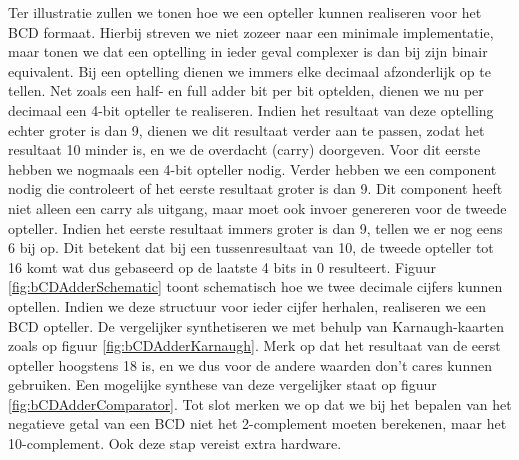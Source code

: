 Ter illustratie zullen we tonen hoe we een opteller kunnen realiseren voor het BCD formaat. Hierbij streven we niet zozeer naar een minimale implementatie, maar tonen we dat een optelling in ieder geval complexer is dan bij zijn binair equivalent. Bij een optelling dienen we immers elke decimaal afzonderlijk op te tellen. Net zoals een half- en full adder bit per bit optelden, dienen we nu per decimaal een 4-bit opteller te realiseren. Indien het resultaat van deze optelling echter groter is dan 9, dienen we dit resultaat verder aan te passen, zodat het resultaat 10 minder is, en we de overdacht (carry) doorgeven. Voor dit eerste hebben we nogmaals een 4-bit opteller nodig. Verder hebben we een component nodig die controleert of het eerste resultaat groter is dan 9. Dit component heeft niet alleen een carry als uitgang, maar moet ook invoer genereren voor de tweede opteller. Indien het eerste resultaat immers groter is dan 9, tellen we er nog eens 6 bij op. Dit betekent dat bij een tussenresultaat van 10, de tweede opteller tot 16 komt wat dus gebaseerd op de laatste 4 bits in 0 resulteert. Figuur \ref{fig:bCDAdderSchematic} toont schematisch hoe we twee decimale cijfers kunnen optellen. Indien we deze structuur voor ieder cijfer herhalen, realiseren we een BCD opteller. De vergelijker synthetiseren we met behulp van Karnaugh-kaarten zoals op figuur \ref{fig:bCDAdderKarnaugh}. Merk op dat het resultaat van de eerst opteller hoogstens 18 is, en we dus voor de andere waarden don't cares kunnen gebruiken. Een mogelijke synthese van deze vergelijker staat op figuur \ref{fig:bCDAdderComparator}. Tot slot merken we op dat we bij het bepalen van het negatieve getal van een BCD niet het 2-complement moeten berekenen, maar het 10-complement. Ook deze stap vereist extra hardware.
